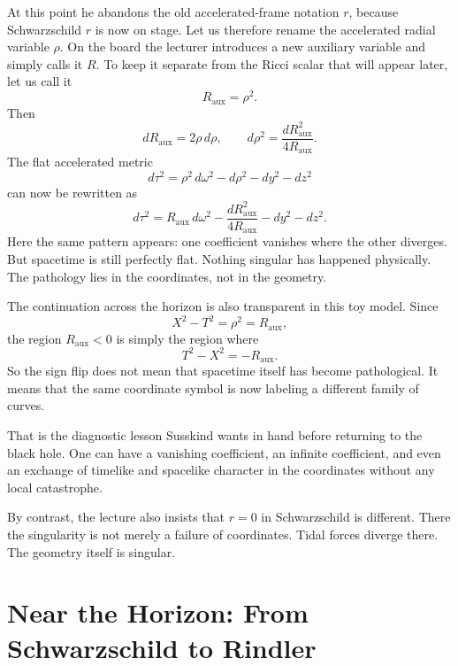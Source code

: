At this point he abandons the old accelerated-frame notation \(r\), because Schwarzschild \(r\) is now on stage. Let us therefore rename the accelerated radial variable \(\rho\). On the board the lecturer introduces a new auxiliary variable and simply calls it \(R\). To keep it separate from the Ricci scalar that will appear later, let us call it
\begin{equation}
R_{\mathrm{aux}}=\rho^2.
\end{equation}
Then
\begin{equation}
dR_{\mathrm{aux}}=2\rho\,d\rho,
\qquad
d\rho^2=\frac{dR_{\mathrm{aux}}^2}{4R_{\mathrm{aux}}}.
\end{equation}
The flat accelerated metric
\begin{equation}
d\tau^2=\rho^2\,d\omega^2-d\rho^2-dy^2-dz^2
\end{equation}
can now be rewritten as
\begin{equation}
d\tau^2
=
R_{\mathrm{aux}}\,d\omega^2
-
\frac{dR_{\mathrm{aux}}^2}{4R_{\mathrm{aux}}}
-
dy^2
-
dz^2.
\end{equation}
Here the same pattern appears: one coefficient vanishes where the other diverges. But spacetime is still perfectly flat. Nothing singular has happened physically. The pathology lies in the coordinates, not in the geometry.

The continuation across the horizon is also transparent in this toy model. Since
\begin{equation}
X^2-T^2=\rho^2=R_{\mathrm{aux}},
\end{equation}
the region \(R_{\mathrm{aux}}<0\) is simply the region where
\begin{equation}
T^2-X^2=-R_{\mathrm{aux}}.
\end{equation}
So the sign flip does not mean that spacetime itself has become pathological. It means that the same coordinate symbol is now labeling a different family of curves.

That is the diagnostic lesson Susskind wants in hand before returning to the black hole. One can have a vanishing coefficient, an infinite coefficient, and even an exchange of timelike and spacelike character in the coordinates without any local catastrophe.

By contrast, the lecture also insists that \(r=0\) in Schwarzschild is different. There the singularity is not merely a failure of coordinates. Tidal forces diverge there. The geometry itself is singular.

\section{Near the Horizon: From Schwarzschild to Rindler}

